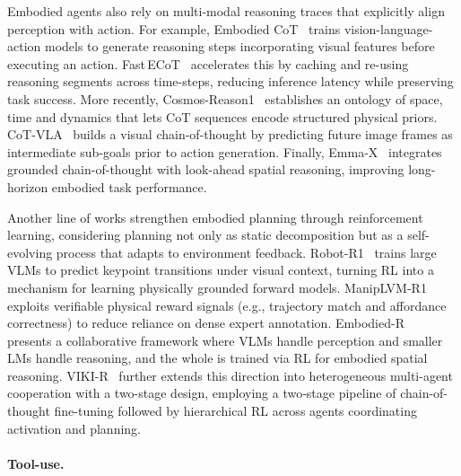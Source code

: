 Embodied agents also rely on multi-modal reasoning traces that explicitly align perception with action. For example, Embodied CoT~\cite{zawalski2024robotic} trains vision-language-action models to generate reasoning steps incorporating visual features before executing an action. Fast\,ECoT~\cite{duan2025fast} accelerates this by caching and re-using reasoning segments across time-steps, reducing inference latency while preserving task success. More recently, Cosmos-Reason1~\cite{nvidia2025cosmosreason1physicalcommonsense} establishes an ontology of space, time and dynamics that lets CoT sequences encode structured physical priors. CoT-VLA~\cite{zhao2025cot} builds a visual chain-of-thought by predicting future image frames as intermediate sub-goals prior to action generation. Finally, Emma-X~\cite{sun2024emmaxembodiedmultimodalaction} integrates grounded chain-of-thought with look-ahead spatial reasoning, improving long-horizon embodied task performance.


Another line of works strengthen embodied planning through reinforcement learning, considering planning not only as static decomposition but as a self-evolving process that adapts to environment feedback. Robot-R1~\cite{kim2025robotr1reinforcementlearningenhanced} trains large VLMs to predict keypoint transitions under visual context, turning RL into a mechanism for learning physically grounded forward models. ManipLVM-R1~\cite{song2025maniplvm} exploits verifiable physical reward signals (e.g., trajectory match and affordance correctness) to reduce reliance on dense expert annotation. Embodied-R~\cite{zhao2025embodied} presents a collaborative framework where VLMs handle perception and smaller LMs handle reasoning, and the whole is trained via RL for embodied spatial reasoning. VIKI-R~\cite{kang2025viki} further extends this direction into heterogeneous multi-agent cooperation with a two-stage design, employing a two‐stage pipeline of chain-of-thought fine-tuning followed by hierarchical RL across agents coordinating activation and planning. 



\paragraph{Tool-use.}

\label{sec:app-embodied-tool}


